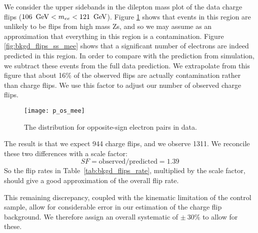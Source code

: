 We consider the upper sidebands in the dilepton mass plot of the data charge
flips ($106\ \GeV < \mee < 121\ \GeV$). Figure \ref{fig:bkgd_flips_mee} shows
that events in this region are unlikely to be flips from high mass Zs, and
so we may assume as an approximation that everything in this region is a
contamination. Figure \ref{fig:bkgd_flips_ss_mee} shows that a significant
number of electrons are indeed predicted in this region. In order to compare
with the prediction from simulation, we subtract these events from the full
data prediction. We extrapolate from this figure that about 16\% of the
observed flips are actually contamination rather than charge flips. We use this
factor to adjust our number of observed charge flips.
\begin{figure}[!hbt]
\begin{center}
\texttt{[image: p\_os\_mee]}
\caption[The \mee distribution for opposite-sign electron pairs in data]
{\label{fig:bkgd_flips_mee}
The \mee distribution for opposite-sign electron pairs in data.
}
\end{center}
\end{figure}

The result is that we expect 944 charge flips, and we observe 1311. We
reconcile these two differences with a scale factor:
\[ SF = \textrm{observed/predicted} = 1.39 \]
So the flip rates in Table~\ref{tab:bkgd_flips_rate}, multiplied by the scale
factor, should give a good approximation of the overall flip rate.

This remaining discrepancy, coupled with the kinematic limitation of the       
control sample, allow for considerable error in our estimation of the charge   
flip background. We therefore assign an overall systematic of $\pm\ 30\%$ to   
allow for these.                                                               

